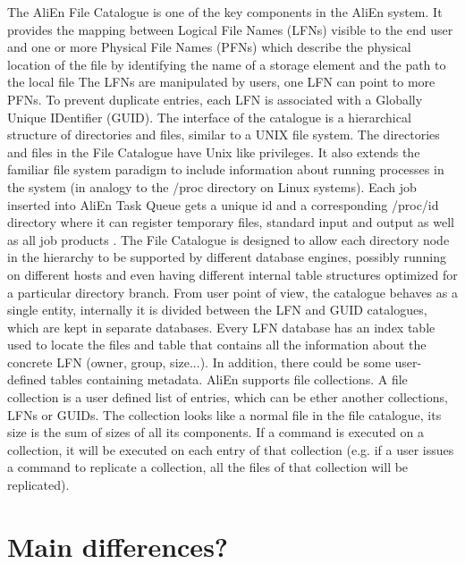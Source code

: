The AliEn File Catalogue is one of the key components in the AliEn system. It
provides the mapping between Logical File Names (LFNs) visible to the end user
and one or more Physical File Names (PFNs) which describe the physical location
of the file by identifying the name of a storage element and the path to the
local file  The LFNs are manipulated by users, one LFN can point to more PFNs.
To prevent duplicate entries, each LFN is associated with a Globally Unique
IDentifier (GUID).
The interface of the catalogue is a hierarchical structure of directories and
files, similar to a UNIX file system. The directories and files in the File
Catalogue have Unix like privileges.
It also extends the familiar file system paradigm to include information about
running processes in the system (in analogy to the /proc directory on Linux
systems). Each job inserted into AliEn Task Queue gets a unique id and a
corresponding /proc/id directory where it can register temporary files,
standard input and output as well as all job products \cite{AliEn1}.
The File Catalogue is designed to allow each directory node in the hierarchy to
be supported by different database engines, possibly running on different hosts
and even having different internal table structures optimized for a particular
directory branch. 
From user point of view, the catalogue behaves as a single entity, internally
it is divided between the LFN and GUID catalogues, which are kept in separate
databases. Every LFN database has an index table used to locate the files and
table that contains all the information about the concrete LFN (owner, group,
size...).
In addition, there could be some user-defined tables containing metadata.
AliEn supports file collections.  A file collection is a user defined list of
entries, which can be ether another collections, LFNs or GUIDs. The collection
looks like a normal file in the file catalogue, its size is the sum of sizes of
all its components. If a command is executed on a collection, it will be
executed on each entry of that collection (e.g. if a user issues a command to
replicate a collection, all the files of that collection will be replicated).

\section{Main differences?}